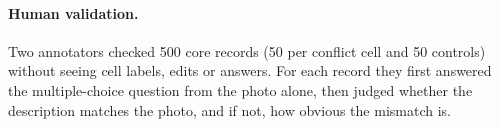 \paragraph{Human validation.}
\label{sec:human}
Two annotators checked 500 core records (50 per conflict cell and 50 controls) without seeing cell labels, edits or answers. For each record they first answered the multiple-choice question from the photo alone, then judged whether the description matches the photo, and if not, how obvious the mismatch is. 
